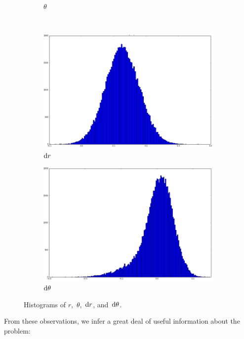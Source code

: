 \documentclass[twoside]{article}
\begin{document}
\begin{figure}[h]
\begin{subfigure}[h]{0.4\textwidth}
    \caption{$\theta$}\label{fig:hist-theta}
  \end{subfigure}\\[2ex]
  \begin{subfigure}[h]{0.4\textwidth}
    \includegraphics[width=\textwidth]{images/AK5}
    \caption{$\mathop{}\!\mathrm{d} r$}\label{fig:hist-dr}
  \end{subfigure}
  \begin{subfigure}[h]{0.4\textwidth}
    \includegraphics[width=\textwidth]{images/AK6}
    \caption{$\mathop{}\!\mathrm{d} \theta$}\label{fig:hist-dtheta}
  \end{subfigure}
  \caption[histograms]{Histograms of $r$,~$\theta$,~${\mathop{}\!\mathrm{d} r}$, and~${\mathop{}\!\mathrm{d} \theta}$.}\label{fig:histograms}
\end{figure}
From these observations, we infer a great deal of useful information about the problem:
\end{document}
